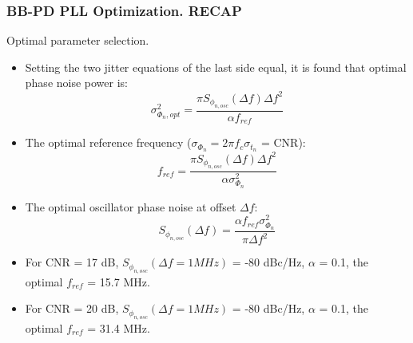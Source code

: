 \documentclass[t, screen, aspectratio=43]{beamer}
\begin{document}
\begin{frame}
	\frametitle{BB-PD PLL Optimization.  \color{red}RECAP}
	\begin{block}{Optimal parameter selection.}
	\tiny
	\begin{itemize}[itemsep=4pt,label=\protect---]
		\item Setting the two jitter equations of the last side equal, it is found that optimal phase noise power is:
		\tiny
		\begin{equation}
			\sigma^2_{\Phi_n, opt} = \frac{\pi S_{\phi_{n,osc}}(\Delta f) \Delta f^2}{\alpha f_{ref}}
		\end{equation}
		\item The optimal reference frequency ($\sigma_{\Phi_n}=2\pi f_c \sigma_{t_n}$ = CNR):
		\begin{equation}
			f_{ref} = \frac{\pi S_{\phi_{n,osc}}(\Delta f) \Delta f^2}{\alpha \sigma^2_{\Phi_n}}
		\end{equation}
		\item The optimal oscillator phase noise at offset $\Delta f$:
		\begin{equation}
			S_{\phi_{n,osc}}(\Delta f) = \frac{\alpha f_{ref}\sigma^2_{\Phi_n}}{\pi \Delta f^2} 
		\end{equation}
		\item For CNR = 17 dB, $S_{\phi_{n,osc}}(\Delta f = 1 MHz)$ = -80 dBc/Hz, $\alpha$ = 0.1, {\color{red}the optimal $f_{ref}$ = 15.7 MHz.}
		\item For CNR = 20 dB, $S_{\phi_{n,osc}}(\Delta f = 1 MHz)$ = -80 dBc/Hz, $\alpha$ = 0.1, {\color{red}the optimal $f_{ref}$ = 31.4 MHz.}
	\end{itemize}


	\end{block}	
\end{frame}








\end{document}
